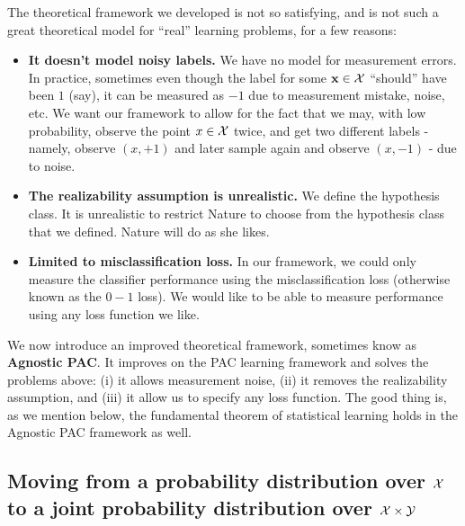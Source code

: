 \documentclass[11pt]{article}
\begin{document}
  The theoretical framework we developed is not so satisfying, and is
  not such a great theoretical model for ``real'' learning problems, for a few
  reasons:
  \begin{itemize}
    \item {\bf It doesn't model noisy labels.} We have no model for measurement errors. In practice, sometimes even
      though the label for some ${\mathbf x}\in\mathcal{X}$ ``should'' have been $1$ (say), it can
      be measured as $-1$ due to measurement mistake, noise, etc. We want our
      framework to allow for the fact that we may, with low probability, observe the point $x\in\mathcal{X}$
      twice, and get two different labels - namely, observe $(x,+1)$ and later
	sample again and observe $(x,-1)$ - due to noise. 
      \item {\bf The realizability assumption is  unrealistic.} We define
        the hypothesis class.  It is unrealistic to restrict Nature to choose
	from the hypothesis class that we defined. Nature will do as she likes.
      \item {\bf Limited to misclassification loss.} In our framework, we could
	only
	measure the classifier performance using the misclassification loss
	(otherwise known as the $0-1$ loss). We would like to be able to measure
	performance using any loss function we like.
  \end{itemize}

  We now introduce an improved theoretical framework, sometimes know as {\bf
  Agnostic PAC}. It improves on the PAC learning framework and  solves the
  problems above: (i) it allows 
  measurement noise,  (ii) it removes the realizability assumption, and (iii) it
  allow us to specify any loss function. The good
  thing is, as we mention below, the fundamental theorem of statistical learning
  holds in the Agnostic PAC framework as well.


  \subsection{Moving from a probability distribution over $\mathcal{X}$ to a joint
  probability distribution over $\mathcal{X}\times\mathcal{Y}$}
\end{document}
